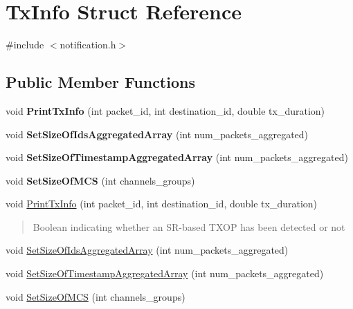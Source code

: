 \hypertarget{structTxInfo}{}\section{Tx\+Info Struct Reference}
\label{structTxInfo}


{\ttfamily \#include $<$notification.\+h$>$}

\subsection*{Public Member Functions}
\begin{DoxyCompactItemize}
\item 
\mbox{\label{structTxInfo_a5766aada8a87f763cfdfcaee1016bbe4}} 
void {\bfseries Print\+Tx\+Info} (int packet\+\_\+id, int destination\+\_\+id, double tx\+\_\+duration)
\item 
\mbox{\label{structTxInfo_a147ec7bc11bf5b573fd1da082337e44f}} 
void {\bfseries Set\+Size\+Of\+Ids\+Aggregated\+Array} (int num\+\_\+packets\+\_\+aggregated)
\item 
\mbox{\label{structTxInfo_afe5b38350ba2e0b39526eee01cf0294b}} 
void {\bfseries Set\+Size\+Of\+Timestamp\+Aggregated\+Array} (int num\+\_\+packets\+\_\+aggregated)
\item 
\mbox{\label{structTxInfo_a169074644cac33d0c8c547ef99dded16}} 
void {\bfseries Set\+Size\+Of\+M\+CS} (int channels\+\_\+groups)
\item 
void \hyperlink{structTxInfo_a5766aada8a87f763cfdfcaee1016bbe4}{Print\+Tx\+Info} (int packet\+\_\+id, int destination\+\_\+id, double tx\+\_\+duration)
\begin{DoxyCompactList}\small\item\em \begin{quote}
Boolean indicating whether an S\+R-\/based T\+X\+OP has been detected or not \end{quote}
\end{DoxyCompactList}\item 
void \hyperlink{structTxInfo_a147ec7bc11bf5b573fd1da082337e44f}{Set\+Size\+Of\+Ids\+Aggregated\+Array} (int num\+\_\+packets\+\_\+aggregated)
\item 
void \hyperlink{structTxInfo_afe5b38350ba2e0b39526eee01cf0294b}{Set\+Size\+Of\+Timestamp\+Aggregated\+Array} (int num\+\_\+packets\+\_\+aggregated)
\item 
void \hyperlink{structTxInfo_a169074644cac33d0c8c547ef99dded16}{Set\+Size\+Of\+M\+CS} (int channels\+\_\+groups)
\end{DoxyCompactItemize}
